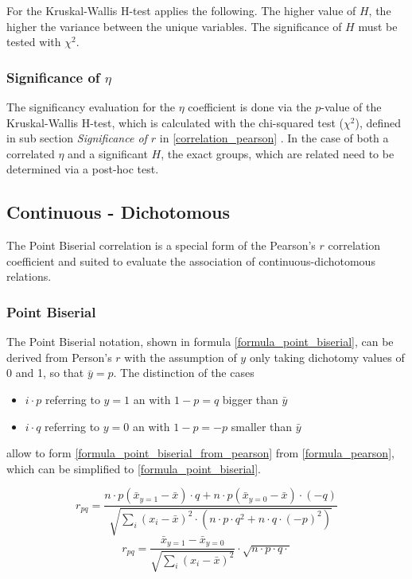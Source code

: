 \documentclass[a4paper,headsepline,footsepline,fontsize=11pt,BCOR=12mm,DIV=12]{report}
\begin{document}
For the Kruskal-Wallis H-test applies the following. The higher value of $H$, the higher the variance between the unique variables. The significance of $H$ must be tested with $\chi^2$.

\subsubsection{Significance of $\eta$}
The significancy evaluation for the $\eta$ coefficient is done via the $p$-value of the Kruskal-Wallis H-test, which is calculated with the chi-squared test ($\chi^2$), defined in sub section \textit{Significance of $r$} in \ref{correlation_pearson} \cite{Filipiak2013}. In the case of both a correlated $\eta$ and a significant $H$, the exact groups, which are related need to be determined via a post-hoc test.

\subsection{Continuous - Dichotomous}
The Point Biserial correlation is a special form of the Pearson's $r$ correlation coefficient and suited to evaluate the association of continuous-dichotomous relations. 

\subsubsection{Point Biserial}
The Point Biserial notation, shown in formula \ref{formula_point_biserial}, can be derived from Person's $r$ with the assumption of $y$ only taking dichotomy values of 0 and 1, so that $\bar{y} = p$. The distinction of the cases

\begin{itemize}
	\item $i \cdot p$ referring to $y=1$ an with $1 - p = q$ bigger than $\bar{y}$
	\item $i \cdot q$ referring to $y=0$ an with $1 - p = -p$ smaller than $\bar{y}$
\end{itemize}
allow to form \ref{formula_point_biserial_from_pearson} from \ref{formula_pearson}, which can be simplified to \ref{formula_point_biserial}. \cite{Tate1954,CohenWest2003,Bortz2004,DeJesus2019}

\smallskip

\begin{equation}
\label{formula_point_biserial_from_pearson}
	r_{pq} =  \frac{n \cdot p (\bar{x}_{y=1}-\bar{x}) \cdot q + n \cdot p (\bar{x}_{y=0}-\bar{x}) \cdot (-q)}{\sqrt{\sum_{i}{(x_i-\bar{x})^2} \cdot (n \cdot p \cdot q^2 + n \cdot q \cdot (-p)^2)}}
\end{equation}
\begin{equation}
\label{formula_point_biserial}
	r_{pq} =  \frac{\bar{x}_{y=1}-\bar{x}_{y=0}}{\sqrt{\sum_{i}{(x_i-\bar{x})^2}}} \cdot \sqrt{n \cdot p \cdot q \cdot} 
\end{equation}
\end{document}
